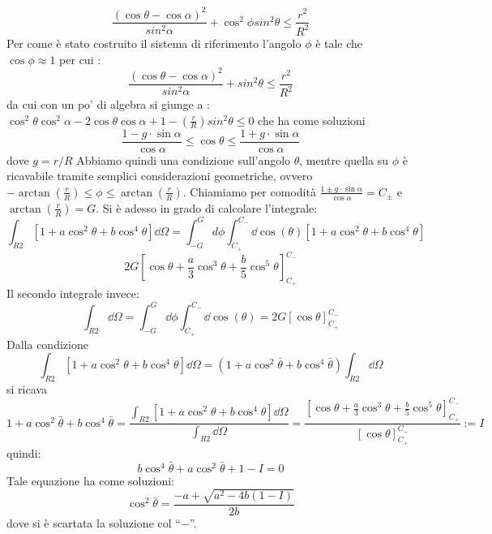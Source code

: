 $$ \frac{\left( \cos \theta -  \cos \alpha \right)^2}{sin^2 \alpha} + \cos^2 \phi sin^2 \theta\le \frac{r^2}{R^2} $$
Per come è stato costruito il sistema di riferimento l'angolo $\phi$ è tale che $\cos \phi \approx 1$ per cui :
$$ \frac{\left( \cos \theta -  \cos \alpha \right)^2}{sin^2 \alpha} + sin^2 \theta\le \frac{r^2}{R^2} $$ 
da cui con un po' di algebra si giunge a :
$\cos^2 \theta \cos^2 \alpha - 2 \cos \theta \cos \alpha +1 - \left(\frac{r}{R}\right) sin^2 \theta \le 0 $
che ha come soluzioni 
$$\frac{1 - g \cdot\sin \alpha}{\cos \alpha} \le \cos \theta \le \frac{1 + g \cdot\sin \alpha}{\cos \alpha}$$
dove $g = r/R$
Abbiamo quindi una condizione sull'angolo $\theta$, mentre quella su $\phi$ è ricavabile tramite semplici considerazioni geometriche, ovvero $-\arctan\left(\frac{r}{R} \right) \le \phi \le \arctan\left(\frac{r}{R} \right)$.
Chiamiamo per comodità $\frac{1 \pm g \cdot\sin \alpha}{\cos \alpha} = C_{\pm}$ e $\arctan\left(\frac{r}{R} \right) = G$. Si è adesso in grado di calcolare l'integrale:
$$ \int_{R2} \left[1 + a \cos ^ 2 \theta + b \cos^4 \theta \right] \dd \Omega = \int_{-G}^{G} d \phi \int_{C_{+}}^{C_{-}} \dd \cos \left(\theta \right) \left[1 + a \cos ^ 2 \theta + b \cos^4 \theta \right] $$
$$ 2G \left[ \cos \theta + \frac{a}{3} \cos ^3 \theta + \frac{b}{5} \cos ^5 \theta \right]_{C_{+}}^{C_{-}} $$
Il secondo integrale invece:
$$ \int_{R2} \dd \Omega = \int_{-G}^{G} \dd \phi \int_{C_{+}}^{C_{-}} \dd \cos \left(\theta \right) = 2G \left[ \cos \theta \right]_{C_{+}}^{C_{-}} $$
Dalla condizione
$$ \int_{R2} \left[1 + a \cos ^ 2 \theta + b \cos^4 \theta \right] \dd \Omega = \left( 1 + a \cos ^ 2 \bar \theta + b \cos^4 \bar\theta \right) \int_{R2} \dd \Omega $$
si ricava
$$1 + a \cos ^ 2 \bar \theta + b \cos^4 \bar\theta = \frac{\int_{R2} \left[1 + a \cos ^ 2 \theta + b \cos^4 \theta \right] \dd \Omega}{\int_{R2} \dd \Omega} =
\frac{\left[ \cos \theta + \frac{a}{3} \cos ^3 \theta + \frac{b}{5} \cos ^5 \theta \right]_{C_{+}}^{C_{-}}}{\left[ \cos \theta \right]_{C_{+}}^{C_{-}}} := I$$
quindi:
$$ b \cos^4 \bar\theta + a \cos ^ 2 \bar \theta + 1 - I= 0 $$
Tale equazione ha come soluzioni:
$$ \cos^2 \bar \theta  = \frac{-a + \sqrt{a^2 - 4b(1 - I)}}{2b} $$
dove si è scartata la soluzione col ``$-$''.

